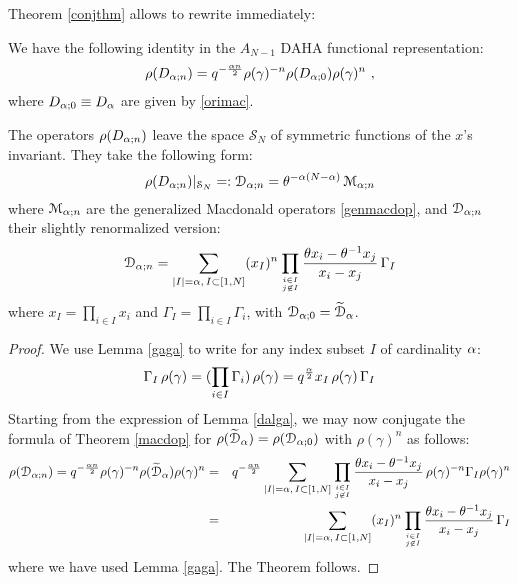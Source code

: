 Theorem \ref{conjthm} allows to rewrite immediately:
\begin{lemma}\label{dalga}
We have the following identity in the $A_{N-1}$ DAHA functional representation:
$$ \rho({D}_{{\alpha};n}) =q^{-\frac{{\alpha} n}{2}}\rho(\gamma)^{-n} \rho({D}_{{\alpha};0})\rho(\gamma)^{n}\ ,$$
where $ {D}_{{\alpha};0}\equiv  {D}_{{\alpha}}$ are given by \eqref{orimac}.
\end{lemma}


\begin{thm}\label{genmacthm}
The operators $\rho({D}_{{\alpha};n})$ leave the space ${\mathcal S}_N$ of symmetric functions of the $x$'s invariant. 
They take the following form:
\begin{equation}\label{genmac}
\rho({D}_{{\alpha};n})\vert_{{\mathcal S}_N}=:{\mathcal D}_{{\alpha};n}=\theta^{-{\alpha}(N-{\alpha})}\, {\mathcal M}_{{\alpha};n}
\end{equation}
where ${\mathcal M}_{{\alpha};n}$ are the generalized Macdonald operators \eqref{genmacdop}, and ${ \mathcal D}_{{\alpha};n}$
their slightly renormalized version:
\begin{equation}\label{defcald}
{ \mathcal D}_{{\alpha};n} 
=\sum_{|I|={\alpha},\, I\subset [1,N]} (x_I)^n \prod_{i\in I \atop j\not \in I} 
\frac{\theta x_i -\theta^{-1} x_j}{x_i-x_j}\, \Gamma_I 
\end{equation}
where $x_I=\prod_{i\in I}x_i$ and $\Gamma_I=\prod_{i\in I}\Gamma_i$, with ${\mathcal D}_{{\alpha};0}=\widetilde{\mathcal D}_{\alpha}$.
\end{thm}
\begin{proof}
We use Lemma \ref{gaga} to write for any index subset $I$ of cardinality ${\alpha}$:
$$ \Gamma_I\, \rho(\gamma)=(\prod_{i\in I}\Gamma_i) \, \rho(\gamma) =q^{\frac{{\alpha}}{2}}x_I \, \rho(\gamma) \, \Gamma_I $$
Starting from the expression of Lemma \ref{dalga}, we may now conjugate the formula of Theorem \ref{macdop} for 
$\rho(\widetilde{\mathcal D}_{\alpha})=\rho({\mathcal D}_{{\alpha};0})$ 
with $\rho(\gamma)^n$ as follows:
\begin{eqnarray*}\rho({\mathcal D}_{{\alpha};n})=q^{-\frac{{\alpha} n}{2}}\rho(\gamma)^{-n}\rho(\widetilde{\mathcal D}_{\alpha})\rho(\gamma)^n
&=&q^{-\frac{{\alpha} n}{2}}\sum_{|I|={\alpha},\, I\subset [1,N]}  \prod_{i\in I \atop j\not \in I} 
\frac{\theta x_i -\theta^{-1} x_j}{x_i-x_j}\, \rho(\gamma)^{-n} \Gamma_I \rho(\gamma)^n\\
&=&\sum_{|I|={\alpha},\, I\subset [1,N]} (x_I)^n 
\prod_{i\in I \atop j\not \in I} \frac{\theta x_i -\theta^{-1} x_j}{x_i-x_j}\,  \Gamma_I
\end{eqnarray*}
where we have used Lemma \ref{gaga}.
The Theorem follows.
\end{proof}



